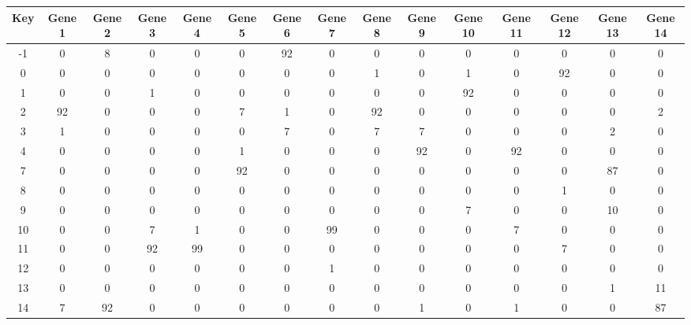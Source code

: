 \begin{tabular}{|c|c|c|c|c|c|c|c|c|c|c|c|c|c|c|}
\hline
Key & Gene 1 & Gene 2 & Gene 3 & Gene 4 & Gene 5 & Gene 6 & Gene 7 & Gene 8 & Gene 9 & Gene 10 & Gene 11 & Gene 12 & Gene 13 & Gene 14 \\
\hline
-1 & 0 & 8 & 0 & 0 & 0 & 92 & 0 & 0 & 0 & 0 & 0 & 0 & 0 & 0 \\
0 & 0 & 0 & 0 & 0 & 0 & 0 & 0 & 1 & 0 & 1 & 0 & 92 & 0 & 0 \\
1 & 0 & 0 & 1 & 0 & 0 & 0 & 0 & 0 & 0 & 92 & 0 & 0 & 0 & 0 \\
2 & 92 & 0 & 0 & 0 & 7 & 1 & 0 & 92 & 0 & 0 & 0 & 0 & 0 & 2 \\
3 & 1 & 0 & 0 & 0 & 0 & 7 & 0 & 7 & 7 & 0 & 0 & 0 & 2 & 0 \\
4 & 0 & 0 & 0 & 0 & 1 & 0 & 0 & 0 & 92 & 0 & 92 & 0 & 0 & 0 \\
7 & 0 & 0 & 0 & 0 & 92 & 0 & 0 & 0 & 0 & 0 & 0 & 0 & 87 & 0 \\
8 & 0 & 0 & 0 & 0 & 0 & 0 & 0 & 0 & 0 & 0 & 0 & 1 & 0 & 0 \\
9 & 0 & 0 & 0 & 0 & 0 & 0 & 0 & 0 & 0 & 7 & 0 & 0 & 10 & 0 \\
10 & 0 & 0 & 7 & 1 & 0 & 0 & 99 & 0 & 0 & 0 & 7 & 0 & 0 & 0 \\
11 & 0 & 0 & 92 & 99 & 0 & 0 & 0 & 0 & 0 & 0 & 0 & 7 & 0 & 0 \\
12 & 0 & 0 & 0 & 0 & 0 & 0 & 1 & 0 & 0 & 0 & 0 & 0 & 0 & 0 \\
13 & 0 & 0 & 0 & 0 & 0 & 0 & 0 & 0 & 0 & 0 & 0 & 0 & 1 & 11 \\
14 & 7 & 92 & 0 & 0 & 0 & 0 & 0 & 0 & 1 & 0 & 1 & 0 & 0 & 87 \\
\hline
\end{tabular}